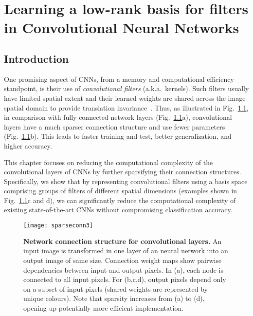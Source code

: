 \documentclass[thesis]{subfiles}
\begin{document}
	
	\chapter{Learning a low-rank basis for filters in Convolutional Neural Networks}
	\label{lowrankfilters}
    
    \section{Introduction}
    One promising aspect of CNNs, from a memory and computational efficiency standpoint, is their use of \emph{convolutional filters} (a.k.a.~kernels). Such filters usually have limited spatial extent and their learned weights are shared across the image spatial domain to provide translation invariance~\citep{fukushima:neocognitronbc,lecun-gradientbased-learning-applied-1998}.
    Thus, as illustrated in Fig.~\ref{fig:sparseconn}, in comparison with fully connected network layers (Fig.~\ref{fig:sparseconn}a), convolutional layers have a much sparser connection structure and use fewer parameters (Fig.~\ref{fig:sparseconn}b).
    This leads to faster training and test, better generalization, and higher accuracy.
    
    This chapter focuses on reducing the computational complexity of the convolutional layers of CNNs by further sparsifying their connection structures.  Specifically, we show that by representing convolutional filters using a basis space comprising groups of filters of different spatial dimensions (examples shown in Fig.~\ref{fig:sparseconn}c and d), we can significantly reduce the computational complexity of existing state-of-the-art CNNs without compromising classification accuracy.
    
    \begin{figure}[t] 
        \centerline{
            \texttt{[image: sparseconn3]}
        }
        \caption[Image access map visualizing sparsity of convolutional filters.]{
            {\bf Network connection structure for convolutional layers.} An input image is transformed in one layer of an neural network into an output image of same size. Connection weight maps show pairwise dependencies between input and output pixels. In (a), each node is connected to all input pixels. For (b,c,d), output pixels depend only on a subset of input pixels (shared weights are represented by unique colours). Note that sparsity increases from (a) to (d), opening up potentially more efficient implementation.
        }
        \label{fig:sparseconn}
    \end{figure}
    
\end{document}
